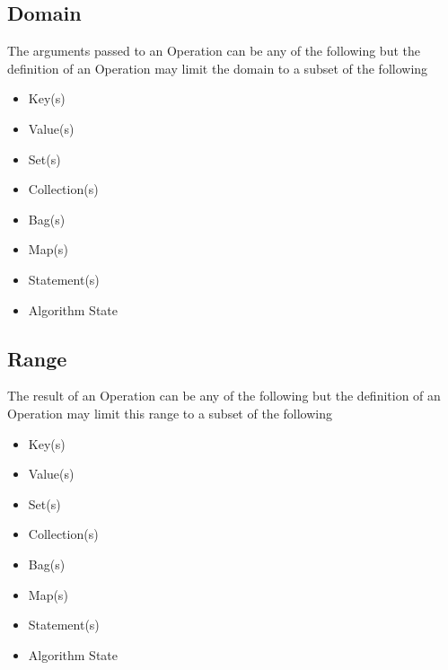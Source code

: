 \documentclass[../main.tex]{subfiles}
\begin{document}
\subsection{Domain}
The arguments passed to an Operation can be any of the following but the definition of an Operation may limit the domain to a subset of the following
\begin{itemize}
\item Key(s)
\item Value(s)
\item Set(s)
\item Collection(s)
\item Bag(s)
\item Map(s)
\item Statement(s)
\item Algorithm State
\end{itemize}

\subsection{Range}
The result of an Operation can be any of the following but the definition of an Operation may limit this range to a subset of the following

\begin{itemize}
\item Key(s)
\item Value(s)
\item Set(s)
\item Collection(s)
\item Bag(s)
\item Map(s)
\item Statement(s)
\item Algorithm State
\end{itemize}
\end{document}
